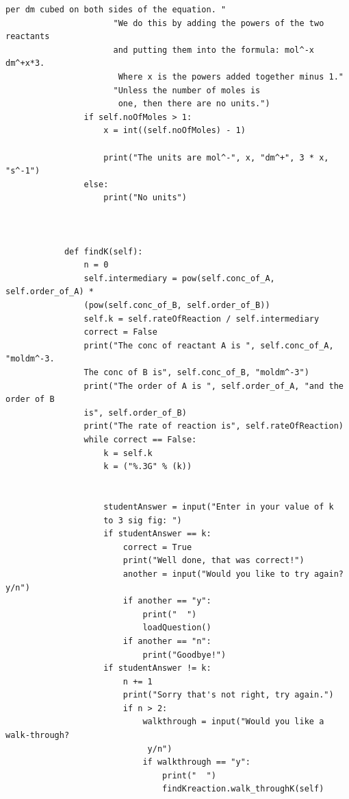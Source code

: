\documentclass[a4paper,12pt]{report}
\begin{document}
\begin{lstlisting}[style = customc]
        per dm cubed on both sides of the equation. "
                      "We do this by adding the powers of the two reactants 
                      and putting them into the formula: mol^-x dm^+x*3.
                       Where x is the powers added together minus 1."
                      "Unless the number of moles is
                       one, then there are no units.")
                if self.noOfMoles > 1:
                    x = int((self.noOfMoles) - 1)
        
                    print("The units are mol^-", x, "dm^+", 3 * x, "s^-1")
                else:
                    print("No units")        
                
        
        
            def findK(self):
                n = 0
                self.intermediary = pow(self.conc_of_A, self.order_of_A) *
                (pow(self.conc_of_B, self.order_of_B))
                self.k = self.rateOfReaction / self.intermediary
                correct = False
                print("The conc of reactant A is ", self.conc_of_A, "moldm^-3.
                The conc of B is", self.conc_of_B, "moldm^-3")
                print("The order of A is ", self.order_of_A, "and the order of B
                is", self.order_of_B)
                print("The rate of reaction is", self.rateOfReaction)
                while correct == False:
                    k = self.k
                    k = ("%.3G" % (k))
                    
        
                    studentAnswer = input("Enter in your value of k
                    to 3 sig fig: ")
                    if studentAnswer == k:
                        correct = True
                        print("Well done, that was correct!")
                        another = input("Would you like to try again? y/n")
                        if another == "y":
                            print("  ")
                            loadQuestion()
                        if another == "n":
                            print("Goodbye!")
                    if studentAnswer != k:
                        n += 1
                        print("Sorry that's not right, try again.")
                        if n > 2:
                            walkthrough = input("Would you like a walk-through? 
                           	 y/n")
                            if walkthrough == "y":
                                print("  ")
                                findKreaction.walk_throughK(self)
                        

\end{lstlisting}
\end{document}
